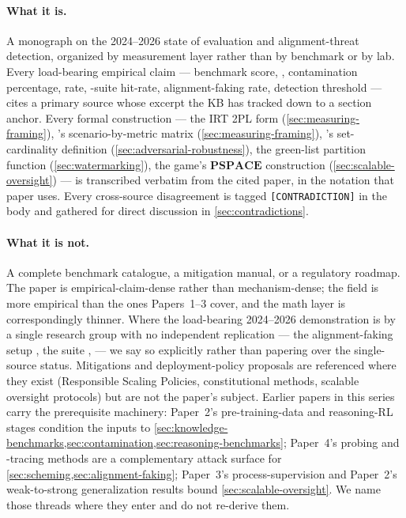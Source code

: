 \paragraph{What it is.} A monograph on the 2024--2026 state of 
evaluation and alignment-threat detection, organized by measurement
layer rather than by benchmark or by lab. Every load-bearing
empirical claim --- benchmark score, , contamination percentage,
 rate, -suite hit-rate, alignment-faking rate,
 detection threshold --- cites a primary source whose
excerpt the KB has tracked down to a section anchor. Every formal
construction --- the IRT 2PL form (\cref{sec:measuring-framing}),
's scenario-by-metric matrix (\cref{sec:measuring-framing}),
's set-cardinality definition (\cref{sec:adversarial-robustness}),
the green-list partition function (\cref{sec:watermarking}), the
 game's $\mathbf{PSPACE}$ construction
(\cref{sec:scalable-oversight}) --- is transcribed verbatim from the
cited paper, in the notation that paper uses. Every cross-source
disagreement is tagged \texttt{[CONTRADICTION]} in the body and
gathered for direct discussion in \cref{sec:contradictions}.

\paragraph{What it is not.} A complete benchmark catalogue, a
mitigation manual, or a regulatory roadmap. The paper is
empirical-claim-dense rather than mechanism-dense; the field is
more empirical than the ones Papers~1--3 cover, and the math layer
is correspondingly thinner. Where the load-bearing 2024--2026
demonstration is by a single research group with no independent
replication --- the alignment-faking setup
\citep{greenblatt2024-alignment-faking}, the  suite
\citep{meinke2024-apollo-scheming}, 
\citep{glazer2024-frontiermath} --- we say so explicitly rather
than papering over the single-source status. Mitigations and
deployment-policy proposals are referenced where they exist
(Responsible Scaling Policies, constitutional methods, scalable
oversight protocols) but are not the paper's subject. Earlier
papers in this series carry the prerequisite machinery: Paper~2's
pre-training-data and reasoning-RL stages condition the inputs to
\cref{sec:knowledge-benchmarks,sec:contamination,sec:reasoning-benchmarks};
Paper~4's probing and -tracing methods are a complementary
attack surface for
\cref{sec:scheming,sec:alignment-faking}; Paper~3's
process-supervision and Paper~2's weak-to-strong generalization
results bound \cref{sec:scalable-oversight}. We name those threads
where they enter and do not re-derive them.

